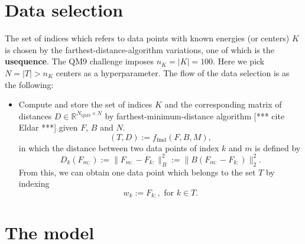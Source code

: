 \documentclass[12pt]{article}
\def\att{                    %
        \marginpar[ \hspace*{\fill} \raisebox{-0.2em}{\rule{2mm}{1.2em}} ]
        {\raisebox{-0.2em}{\rule{2mm}{1.2em}} }
        }
\def\at#1{[*** \att #1 ***]}  %
\begin{document}
\section{Data selection}
\label{sec:data}
The set of indices which refers to data points with known energies (or centers) $K$ is chosen by the farthest-distance-algorithm variations, one of which is the \textbf{usequence}. The QM9 challenge imposes $n_K = |K| = 100$. Here we pick $N = |T| > n_K$ centers as a hyperparameter. The flow of the data selection is as the following:
\begin{itemize}
	\item Compute and store the set of indices $K$ and the corresponding matrix of distances $D \in \mathbb{R}^{N_\text{QM9} \times N}$ by farthest-minimum-distance algorithm \at{cite Eldar} given $F$, $B$ and $N$.
	\begin{equation}
		(T, D) := f_{\text{fmd}}(F, B, M),
	\end{equation}
	in which the distance between two data points of index $k$ and $m$ is defined by
	\begin{equation}
		D_k(F_{m:}) := \|F_{m:} - F_{k:}\|^2_B := \|B(F_{m:} - F_{k:})\|^2_2.
	\end{equation}
	From this, we can obtain one data point which belongs to the set $T$ by indexing
	\begin{equation}
		w_k := F_{k:}, \text{ for } k \in T.
	\end{equation}
\end{itemize}

\section{The model}
\label{sec:model}
\end{document}
